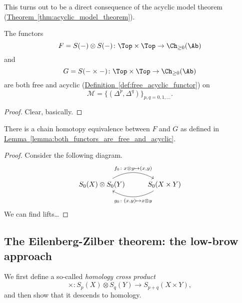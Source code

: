 \documentclass[main.tex]{subfiles}
\begin{document}
This turns out to be a direct consequence of the acyclic model theorem (\hyperref[thm:acyclic_model_theorem]{Theorem~\ref*{thm:acyclic_model_theorem}}).

\begin{lemma}
  \label{lemma:both_functors_are_free_and_acyclic}
  The functors
  \begin{equation*}
    F = S(-) \otimes S(-)\colon \Top \times \Top \to \Ch_{\geq 0}(\Ab)
  \end{equation*}
  and
  \begin{equation*}
    G = S(- \times -)\colon \Top \times \Top \to \Ch_{\geq 0}(\Ab)
  \end{equation*}
  are both free and acyclic (\hyperref[def:free_acyclic_functor]{Definition~\ref*{def:free_acyclic_functor}}) on
  \begin{equation*}
    \mathcal{M} = \{(\Delta^{p}, \Delta^{q})\}_{p, q = 0, 1, \ldots}.
  \end{equation*}
\end{lemma}
\begin{proof}
  Clear, basically.
\end{proof}

\begin{proposition}
  There is a chain homotopy equivalence between $F$ and $G$ as defined in \hyperref[lemma:both_functors_are_free_and_acyclic]{Lemma~\ref*{lemma:both_functors_are_free_and_acyclic}}.
\end{proposition}
\begin{proof}
  Consider the following diagram.
  \begin{equation*}
    \begin{tikzcd}
      S_{0}(X) \otimes S_{0}(Y)
      \arrow[r, bend left, "{f_{0}\colon x \otimes y \mapsto (x, y)}"]
      & S_{0}(X \times Y)
      \arrow[l, bend left, "{g_{0}\colon (x, y) \mapsto x \otimes y}"]
    \end{tikzcd}
  \end{equation*}
  We can find lifts\dots
\end{proof}

\subsection{The Eilenberg-Zilber theorem: the low-brow approach}
\label{ssc:eilenberg_zilber_low_brow}

We first define a so-called \emph{homology cross product}
\begin{equation*}
  \times\colon S_{p}(X) \otimes S_{q}(Y) \to S_{p+q}(X \times Y),
\end{equation*}
and then show that it descends to homology.
\end{document}
